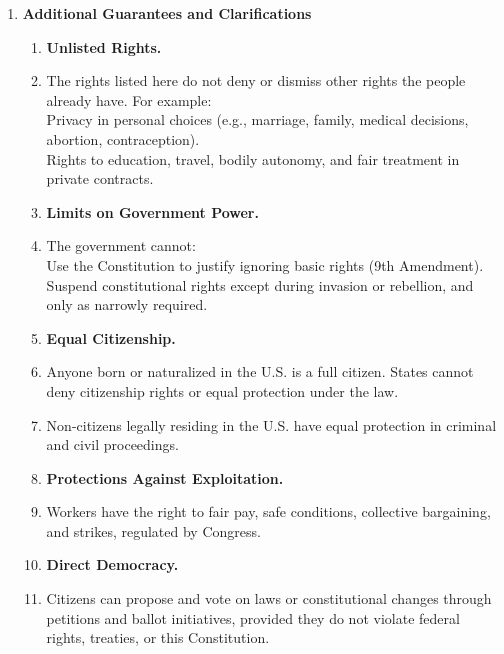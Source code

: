 \documentclass{article}
\begin{document}
\begin{multicols}{2}
\begin{enumerate}[label=\Alph*)]
\begin{enumerate}[label=\Alph*), start=4]
    \item \textbf{Additional Guarantees and Clarifications}
    
    \begin{enumerate}[label=2.4.\arabic*]
        \item[] \textbf{Unlisted Rights.}
        \item The rights listed here do not deny or dismiss other rights the people already have. For example: \\
        Privacy in personal choices (e.g., marriage, family, medical decisions, abortion, contraception). \\
        Rights to education, travel, bodily autonomy, and fair treatment in private contracts.
        
        \item[] \textbf{Limits on Government Power.}
        \item The government cannot: \\
        Use the Constitution to justify ignoring basic rights (9th Amendment). \\
        Suspend constitutional rights except during invasion or rebellion, and only as narrowly required.
        
        \item[] \textbf{Equal Citizenship.}
        \item Anyone born or naturalized in the U.S. is a full citizen. States cannot deny citizenship rights or equal protection under the law.
        
        \item Non-citizens legally residing in the U.S. have equal protection in criminal and civil proceedings.
        
        \item[] \textbf{Protections Against Exploitation.}
        \item Workers have the right to fair pay, safe conditions, collective bargaining, and strikes, regulated by Congress.
        
        \item[] \textbf{Direct Democracy.}
        \item Citizens can propose and vote on laws or constitutional changes through petitions and ballot initiatives, provided they do not violate federal rights, treaties, or this Constitution.
    \end{enumerate}
 







\end{enumerate}
\end{enumerate}
\end{multicols}
\end{document}
